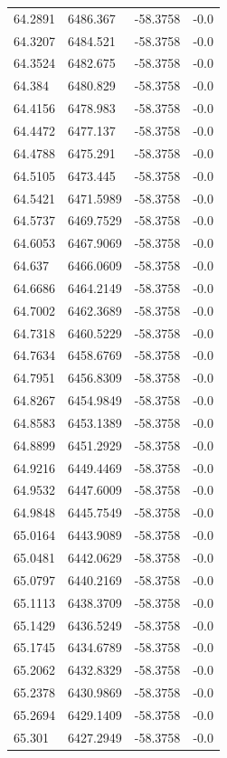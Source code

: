 \begin{table}[H]
\begin{tabular}{llll}
64.2891 & 6486.367 & -58.3758 & -0.0 \\
64.3207 & 6484.521 & -58.3758 & -0.0 \\
64.3524 & 6482.675 & -58.3758 & -0.0 \\
64.384 & 6480.829 & -58.3758 & -0.0 \\
64.4156 & 6478.983 & -58.3758 & -0.0 \\
64.4472 & 6477.137 & -58.3758 & -0.0 \\
64.4788 & 6475.291 & -58.3758 & -0.0 \\
64.5105 & 6473.445 & -58.3758 & -0.0 \\
64.5421 & 6471.5989 & -58.3758 & -0.0 \\
64.5737 & 6469.7529 & -58.3758 & -0.0 \\
64.6053 & 6467.9069 & -58.3758 & -0.0 \\
64.637 & 6466.0609 & -58.3758 & -0.0 \\
64.6686 & 6464.2149 & -58.3758 & -0.0 \\
64.7002 & 6462.3689 & -58.3758 & -0.0 \\
64.7318 & 6460.5229 & -58.3758 & -0.0 \\
64.7634 & 6458.6769 & -58.3758 & -0.0 \\
64.7951 & 6456.8309 & -58.3758 & -0.0 \\
64.8267 & 6454.9849 & -58.3758 & -0.0 \\
64.8583 & 6453.1389 & -58.3758 & -0.0 \\
64.8899 & 6451.2929 & -58.3758 & -0.0 \\
64.9216 & 6449.4469 & -58.3758 & -0.0 \\
64.9532 & 6447.6009 & -58.3758 & -0.0 \\
64.9848 & 6445.7549 & -58.3758 & -0.0 \\
65.0164 & 6443.9089 & -58.3758 & -0.0 \\
65.0481 & 6442.0629 & -58.3758 & -0.0 \\
65.0797 & 6440.2169 & -58.3758 & -0.0 \\
65.1113 & 6438.3709 & -58.3758 & -0.0 \\
65.1429 & 6436.5249 & -58.3758 & -0.0 \\
65.1745 & 6434.6789 & -58.3758 & -0.0 \\
65.2062 & 6432.8329 & -58.3758 & -0.0 \\
65.2378 & 6430.9869 & -58.3758 & -0.0 \\
65.2694 & 6429.1409 & -58.3758 & -0.0 \\
65.301 & 6427.2949 & -58.3758 & -0.0 \\

\end{tabular}
\end{table}

